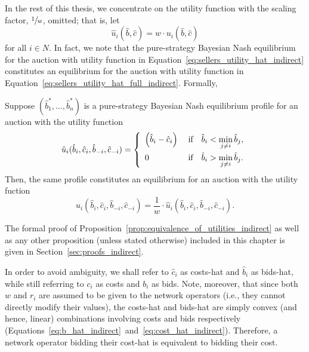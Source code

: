 In the rest of this thesis, we concentrate on the utility function with the scaling factor, $\displaystyle\sfrac{1}{w}$, omitted; that is, let
\begin{equation}
  \label{eq:sellers_utility_hat_indirect}
    \hat{u}_i(\hat{b},\hat{c}) = w\cdot u_i(\hat{b}, \hat{c})
\end{equation}
for all $i\in N$. In fact, we note that the pure-strategy Bayesian Nash equilibrium for the auction with utility function in Equation~\eqref{eq:sellers_utility_hat_indirect} constitutes an equilibrium for the auction with utility function in Equation~\eqref{eq:sellers_utility_hat_full_indirect}. Formally,
\begin{proposition}
\label{prop:equivalence_of_utilities_indirect}
Suppose $(\hat{b}_1^*, \ldots, \hat{b}_n^*)$ is a pure-strategy Bayesian Nash equilibrium profile for an auction with the utility function
\begin{equation*}
  \hat{u}_i(\hat{b}_i,\hat{c}_i,\hat{b}_{-i},\hat{c}_{-i}) = \left\{
  \begin{array}{l l}
    \displaystyle\left(\hat{b}_i-\hat{c}_i\right) & \;\textrm{if}\quad\hat{b}_i < \displaystyle\min_{j\neq i}\hat{b}_j,\\[2ex]
    0 & \;\textrm{if}\quad\hat{b}_i > \displaystyle\min_{j\neq i}\hat{b}_j.
  \end{array}\right.
\end{equation*}
Then, the same profile constitutes an equilibrium for an auction with the utility fuction
\begin{equation*}
  u_i(\hat{b}_i,\hat{c}_i,\hat{b}_{-i},\hat{c}_{-i}) = \frac{1}{w}\cdot \hat{u}_i(\hat{b}_i,\hat{c}_i,\hat{b}_{-i},\hat{c}_{-i}).
\end{equation*}
\end{proposition}
\noindent The formal proof of Proposition~\ref{prop:equivalence_of_utilities_indirect} as well as any other proposition (unless stated otherwise) included in this chapter is given in Section~\ref{sec:proofs_indirect}.

In order to avoid ambiguity, we shall refer to $\hat{c}_i$ as costs-hat and $\hat{b}_i$ as bids-hat, while still referring to $c_i$ as costs and $b_i$ as bids. Note, moreover, that since both $w$ and $r_i$ are assumed to be given to the network operators (i.e., they cannot directly modify their values), the costs-hat and bids-hat are simply convex (and hence, linear) combinations involving costs and bids respectively (Equations~\eqref{eq:b_hat_indirect}~and~\eqref{eq:cost_hat_indirect}). Therefore, a network operator bidding their cost-hat is equivalent to bidding their cost.

